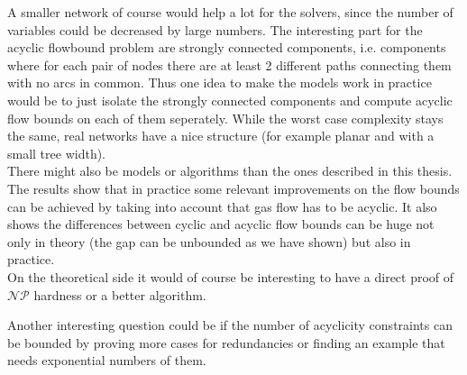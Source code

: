 A smaller network of course would help a lot for the solvers, since the number of variables could be decreased by large 
numbers. The interesting part for the acyclic flowbound problem are strongly connected components, i.e. 
components where for each pair of nodes there are at least 2 different paths connecting them with no arcs in common. 
Thus one idea to make the models work in practice would be to just isolate the strongly connected components and 
compute acyclic flow bounds on each of them seperately. While the worst case complexity stays the same, real networks 
have a nice structure (for example planar and with a small tree width).\\

There might also be models or algorithms than the ones described in this thesis. The results show that in 
practice some relevant improvements on the flow bounds can be achieved by taking into account that gas flow has to be 
acyclic. It also shows the differences between cyclic and acyclic flow bounds can be huge not only in theory (the gap 
can be unbounded as we have shown) but also in practice.\\

On the theoretical side it would of course be interesting to have a direct proof of $\mathcal{NP}$ hardness or a better 
algorithm. 

Another interesting question could be if the number of acyclicity constraints can be bounded by proving more cases for 
redundancies or finding an example that needs exponential numbers of them. 

